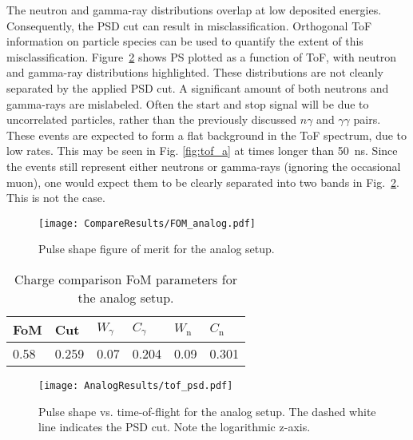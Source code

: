 \documentclass[main.tex]{subfiles}
\begin{document}
The neutron and gamma-ray distributions overlap at low deposited energies. Consequently, the PSD cut can result in misclassification. Orthogonal ToF information on particle species can be used to quantify the extent of this misclassification.
Figure~\ref{fig:tof_ps_a} shows PS plotted as a function of ToF, with neutron and gamma-ray distributions highlighted. 
These distributions are not cleanly separated by the applied PSD cut. A significant amount of both neutrons and gamma-rays are mislabeled. Often the start and stop signal will be due to uncorrelated particles, rather than the previously discussed $n\gamma$ and $\gamma\gamma$ pairs. These events are expected to form a flat background in the ToF spectrum, due to low rates. This may be seen in Fig. \ref{fig:tof_a} at times longer than \SI{50}{ns}. Since the events still represent either neutrons or gamma-rays (ignoring the occasional muon), one would expect them to be clearly separated into two bands in Fig.~\ref{fig:tof_ps_a}. This is not the case.


\begin{figure}[h!]
	    \centering
    	    \texttt{[image: CompareResults/FOM\_analog.pdf]}
    \caption[Pulse shape figure of merit for the analog setup.]{Pulse shape figure of merit for the analog setup.}
    \label{fig:fom_a} 
\end{figure}
\begin{table}[h]
\center
\begin{tabular}{|l|l|l|l|l|l|}
\hline
FoM  & Cut   & $W_\gamma$ & $C_\gamma$ & $W_\textrm{n}$ & $C_\textrm{n}$ \\ \hline
0.58 & 0.259 & 0.07          & 0.204           & 0.09              & 0.301               \\ \hline
\end{tabular}
\caption{Charge comparison FoM parameters for the analog setup.}
\label{tab:fom_a}
\end{table}




\begin{figure}[h!]
    \centering
        \texttt{[image: AnalogResults/tof\_psd.pdf]}
        \caption[Pulse shape vs. time-of-flight for the analog setup.]{Pulse shape vs. time-of-flight for the analog setup. The dashed white line indicates the PSD cut. Note the logarithmic z-axis.}
    \label{fig:tof_ps_a} 
\end{figure}
\end{document}
